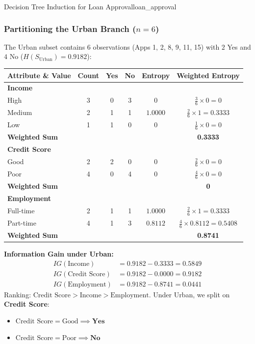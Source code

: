 \begin{example}{Decision Tree Induction for Loan Approval}{loan_approval}
\subsubsection{Partitioning the Urban Branch (\texorpdfstring{$n = 6$}{n = 6})}
The Urban subset contains 6 observations (Apps 1, 2, 8, 9, 11, 15) with $2$ Yes and $4$ No ($H(S_{\text{Urban}}) = 0.9182$):
\begin{center}\renewcommand{\arraystretch}{1.35}
\begin{tabular}{lccccc}
\toprule
\textbf{Attribute \& Value} & \textbf{Count} & \textbf{Yes} & \textbf{No} & \textbf{Entropy} & \textbf{Weighted Entropy} \\
\midrule
\textbf{Income} & & & & & \\
High & 3 & 0 & 3 & $0$ & $\frac{3}{6} \times 0 = 0$ \\
Medium & 2 & 1 & 1 & $1.0000$ & $\frac{2}{6} \times 1 = 0.3333$ \\
Low & 1 & 1 & 0 & $0$ & $\frac{1}{6} \times 0 = 0$ \\
\textbf{Weighted Sum} & & & & & \textbf{0.3333} \\
\midrule
\textbf{Credit Score} & & & & & \\
Good & 2 & 2 & 0 & $0$ & $\frac{2}{6} \times 0 = 0$ \\
Poor & 4 & 0 & 4 & $0$ & $\frac{4}{6} \times 0 = 0$ \\
\textbf{Weighted Sum} & & & & & \textbf{0} \\
\midrule
\textbf{Employment} & & & & & \\
Full-time & 2 & 1 & 1 & $1.0000$ & $\frac{2}{6} \times 1 = 0.3333$ \\
Part-time & 4 & 1 & 3 & $0.8112$ & $\frac{4}{6} \times 0.8112 = 0.5408$ \\
\textbf{Weighted Sum} & & & & & \textbf{0.8741} \\
\bottomrule
\end{tabular}
\end{center}

\textbf{Information Gain under Urban:}
\begin{align*}
    IG(\text{Income}) &= 0.9182 - 0.3333 = 0.5849 \\[4pt]
    IG(\text{Credit Score}) &= 0.9182 - 0.0000 = \mathbf{0.9182} \\[4pt]
    IG(\text{Employment}) &= 0.9182 - 0.8741 = 0.0441
\end{align*}
Ranking: $\text{Credit Score} > \text{Income} > \text{Employment}$.
Under Urban, we split on \textbf{Credit Score}:
\begin{itemize}
    \item $\text{Credit Score} = \text{Good} \implies \mathbf{Yes}$
    \item $\text{Credit Score} = \text{Poor} \implies \mathbf{No}$
\end{itemize}


\end{example}
